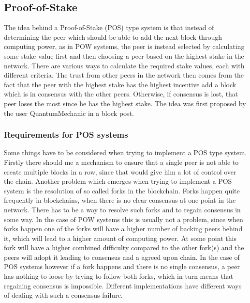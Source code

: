 \subsection{Proof-of-Stake}

The idea behind a Proof-of-Stake (POS) type system is that instead of determining the peer which should be able to add the next block through computing power, as in POW systems, the peer is instead
selected by calculating some stake value first and then choosing a peer based on the highest stake in the network. There are various ways to calculate the required stake values, each with different
criteria. The trust from other peers in the network then comes from the fact that the peer with the highest stake has the highest incentive add a block which is in consensus with the other peers.
Otherwise, if consensus is lost, that peer loses the most since he has the highest stake. The idea was first proposed by the user QuantumMechanic in a block post.\cite{url:pos}

\subsubsection{Requirements for POS systems}

Some things have to be considered when trying to implement a POS type system. Firstly there should me a mechanism to ensure that a single peer is not able to create multiple blocks in a row, since
that would give him a lot of control over the chain. Another problem which emerges when trying to implement a POS system is the resolution of so called forks in the blockchain. Forks happen
quite frequently in blockchains, when there is no clear consensus at one point in the network. There has to be a way to resolve such forks and to regain consensus in some way. In the case of
POW systems this is usually not a problem, since when forks happen one of the forks will have a higher number of backing peers behind it, which will lead to a higher amount of computing power.
At some point this fork will have a higher combined difficulty compared to the other fork(s) and the peers will adopt it leading to consensus and a agreed upon chain.\cite{url:bitcoin}
In the case of POS systems however if a fork happens and there is no single consensus, a peer has nothing to loose by trying to follow both forks, which in turn means that regaining
consensus is impossible. Different implementations have different ways of dealing with such a consensus failure.\cite{url:pos_impossible}

